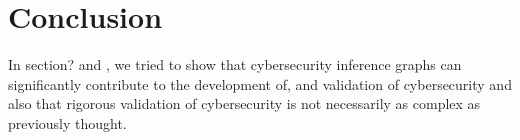 \chapter{Conclusion}
In  section? and  , we tried to show that cybersecurity inference graphs can significantly contribute to the development of, and validation of cybersecurity and also that rigorous validation of cybersecurity is not necessarily as complex as previously thought.
